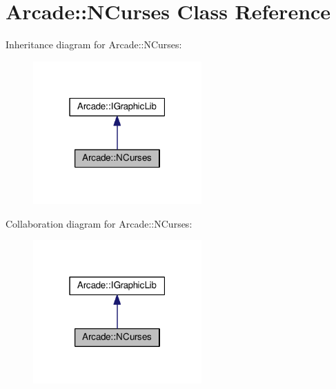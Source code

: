 \hypertarget{class_arcade_1_1_n_curses}{}\section{Arcade\+:\+:N\+Curses Class Reference}
\label{class_arcade_1_1_n_curses}


Inheritance diagram for Arcade\+:\+:N\+Curses\+:
\nopagebreak
\begin{figure}[H]
\begin{center}
\leavevmode
\includegraphics[width=183pt]{class_arcade_1_1_n_curses__inherit__graph}
\end{center}
\end{figure}


Collaboration diagram for Arcade\+:\+:N\+Curses\+:
\nopagebreak
\begin{figure}[H]
\begin{center}
\leavevmode
\includegraphics[width=183pt]{class_arcade_1_1_n_curses__coll__graph}
\end{center}
\end{figure}
